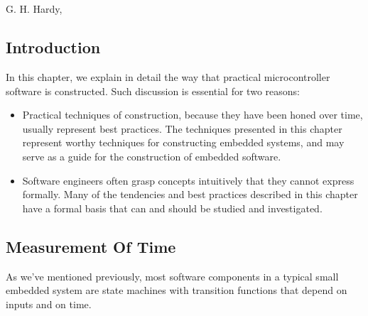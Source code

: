 \chapter{\cpcozerolongtitle{}}

\label{cpco0}

                     {G. H. Hardy, \cite{bibref:b:mathematiciansapology:1940}}

\section{Introduction}
\label{cpco0:sint0}

In this chapter, we explain in detail the way that
practical microcontroller software is constructed.
Such discussion is essential for two reasons:

\begin{itemize}
\item Practical techniques of construction, because they have 
      been honed over time, usually represent best practices.
      The techniques presented in this chapter represent worthy
      techniques for constructing embedded systems, and may
      serve as a guide for the construction of embedded software.
\item Software engineers often grasp concepts intuitively that they
      cannot express formally.  Many of the tendencies and best practices
      described in this chapter have a formal basis that can and should be
      studied and investigated.
\end{itemize}


\section{Measurement Of Time}
\label{cpco0:smot0}

As we've mentioned previously, most software components in a
typical small embedded system are state machines with transition
functions that depend on inputs and on time.

